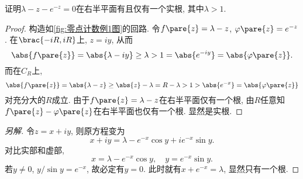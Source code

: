 \documentclass[../ComplexVariable.tex]{subfiles}
\begin{document}
\begin{sample}
    \begin{ex}
        \label{ex:零点计数例1}
        证明$\lambda - z - e^{-z} = 0$在右半平面有且仅有一个实根, 其中$\lambda > 1$.
    \end{ex}
    \begin{proof}
        构造如\cref{fig:零点计数例1图}的回路. 令$f\pare{z} = \lambda - z$, $\varphi\pare{z} = e^{-z}$. 在$\brac{-iR,iR}$上, $z = iy$, 从而
        \[ \abs{f\pare{z}} = \abs{\lambda-iy} \ge \lambda > 1 = \abs{e^{-iy}} = \abs{\varphi\pare{z}}. \]
        而在$C_R$上,
        \[ \abs{f\pare{z}} = \abs{\lambda - z} \ge \abs{z} - \lambda = R-\lambda > 1 > \abs{e^{-x}} = \abs{\varphi\pare{z}} \]
        对充分大的$R$成立. 由于$f\pare{z} = \lambda - z$在右半平面仅有一个根, 由$R$任意知$f\pare{z} - \varphi\pare{z}$在右半平面也仅有一个根. 显然是实根.
    \end{proof}
    \begin{proof}[另解]
        令$z = x + iy$, 则原方程变为
        \[ x + iy = \lambda - e^{-x}\cos y + ie^{-x}\sin y. \]
        对比实部和虚部,
        \[ x = \lambda - e^{-x}\cos y,\quad y = e^{-x}\sin y. \]
        若$y\neq 0$, $y/\sin y = e^{-x}$, 故必定有$y = 0$. 此时就有$x + e^{-x} = \lambda$, 显然只有一个根.
    \end{proof}
\end{sample}


\end{document}
